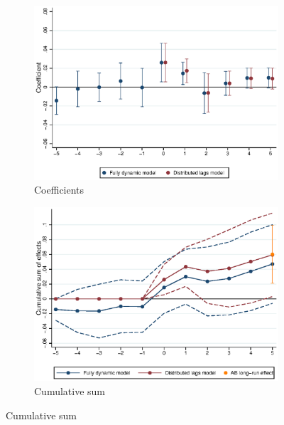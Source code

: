 \begin{figure}[htb!]
    \caption{The Dynamic Effects of MW Changes on Rents}
    \label{fig:dynamic_models_main}
    \centering
    \begin{subfigure}[b]{0.7\textwidth}
    	\caption{Coefficients}
    	\label{fig:dynamic_model_coeffs}
    	\includegraphics[width = \textwidth]
    	{../../analysis/first_differences/output/fd_models_coeffs_w5.eps}
    \end{subfigure}
    \begin{subfigure}[b]{0.7\textwidth}
    	\caption{Cumulative sum}
    	\label{fig:dynamic_model_cumsum}
    	\includegraphics[width = \textwidth]
    	{../../analysis/first_differences/output/fd_models_cumsum.eps}
    \end{subfigure}
    \begin{minipage}{0.95\textwidth} \footnotesize

\end{minipage}
\end{figure}
